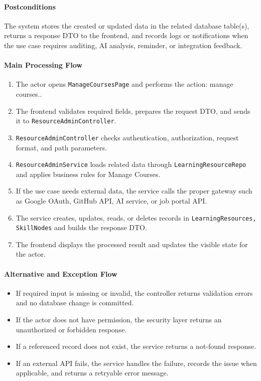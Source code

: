 \paragraph{Postconditions}

The system stores the created or updated data in the related database table(s), returns a response DTO to the frontend, and records logs or notifications when the use case requires auditing, AI analysis, reminder, or integration feedback.

\paragraph{Main Processing Flow}

\begin{enumerate}
    \item The actor opens \texttt{ManageCoursesPage} and performs the action: manage courses..
    \item The frontend validates required fields, prepares the request DTO, and sends it to \texttt{ResourceAdminController}.
    \item \texttt{ResourceAdminController} checks authentication, authorization, request format, and path parameters.
    \item \texttt{ResourceAdminService} loads related data through \texttt{LearningResourceRepo} and applies business rules for Manage Courses.
    \item If the use case needs external data, the service calls the proper gateway such as Google OAuth, GitHub API, AI service, or job portal API.
    \item The service creates, updates, reads, or deletes records in \texttt{LearningResources, SkillNodes} and builds the response DTO.
    \item The frontend displays the processed result and updates the visible state for the actor.
\end{enumerate}

\paragraph{Alternative and Exception Flow}

\begin{itemize}
    \item If required input is missing or invalid, the controller returns validation errors and no database change is committed.
    \item If the actor does not have permission, the security layer returns an unauthorized or forbidden response.
    \item If a referenced record does not exist, the service returns a not-found response.
    \item If an external API fails, the service handles the failure, records the issue when applicable, and returns a retryable error message.
\end{itemize}

